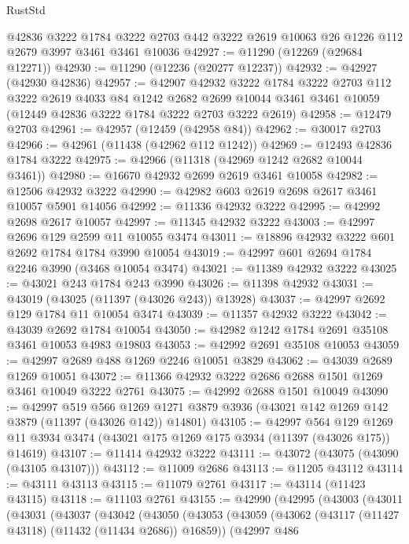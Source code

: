 \begin{lexlean}{RustStd}
\begin{coremodule}
    @42836
    @3222
    @1784
    @3222
    @2703
    @442
    @3222
    @2619
    @10063
    @26
    @1226
    @112
    @2679
    @3997
    @3461
    @3461
    @10036
@42927 := @11290 (@12269 (@29684 @12271))
@42930 := @11290 (@12236 (@20277 @12237))
@42932 := @42927 (@42930 @42836)
@42957 := @42907
    @42932
    @3222
    @1784
    @3222
    @2703
    @112
    @3222
    @2619
    @4033
    @84
    @1242
    @2682
    @2699
    @10044
    @3461
    @3461
    @10059
    (@12449 @42836 @3222 @1784 @3222 @2703 @3222 @2619)
@42958 := @12479 @2703
@42961 := @42957 (@12459 (@42958 @84))
@42962 := @30017 @2703
@42966 := @42961 (@11438 (@42962 @112 @1242))
@42969 := @12493 @42836 @1784 @3222
@42975 := @42966 (@11318 (@42969 @1242 @2682 @10044 @3461))
@42980 := @16670 @42932 @2699 @2619 @3461 @10058
@42982 := @12506 @42932 @3222
@42990 := @42982 @603 @2619 @2698 @2617 @3461 @10057 @5901 @14056
@42992 := @11336 @42932 @3222
@42995 := @42992 @2698 @2617 @10057
@42997 := @11345 @42932 @3222
@43003 := @42997 @2696 @129 @2599 @11 @10055 @3474
@43011 := @18896 @42932 @3222 @601 @2692 @1784 @1784 @3990 @10054
@43019 := @42997 @601 @2694 @1784 @2246 @3990 (@3468 @10054 @3474)
@43021 := @11389 @42932 @3222
@43025 := @43021 @243 @1784 @243 @3990
@43026 := @11398 @42932
@43031 := @43019 (@43025 (@11397 (@43026 @243)) @13928)
@43037 := @42997 @2692 @129 @1784 @11 @10054 @3474
@43039 := @11357 @42932 @3222
@43042 := @43039 @2692 @1784 @10054
@43050 := @42982 @1242 @1784 @2691 @35108 @3461 @10053 @4983 @19803
@43053 := @42992 @2691 @35108 @10053
@43059 := @42997 @2689 @488 @1269 @2246 @10051 @3829
@43062 := @43039 @2689 @1269 @10051
@43072 := @11366 @42932 @3222 @2686 @2688 @1501 @1269 @3461 @10049 @3222 @2761
@43075 := @42992 @2688 @1501 @10049
@43090 := @42997
    @519
    @566
    @1269
    @1271
    @3879
    @3936
    (@43021 @142 @1269 @142 @3879 (@11397 (@43026 @142)) @14801)
@43105 := @42997
    @564
    @129
    @1269
    @11
    @3934
    @3474
    (@43021 @175 @1269 @175 @3934 (@11397 (@43026 @175)) @14619)
@43107 := @11414 @42932 @3222
@43111 := @43072 (@43075 (@43090 (@43105 @43107)))
@43112 := @11009 @2686
@43113 := @11205 @43112
@43114 := @43111 @43113
@43115 := @11079 @2761
@43117 := @43114 (@11423 @43115)
@43118 := @11103 @2761
@43155 := @42990
    (@42995
      (@43003
        (@43011
          (@43031
            (@43037
              (@43042
                (@43050
                  (@43053
                    (@43059
                      (@43062 (@43117 (@11427 @43118) (@11432 (@11434 @2686)) @16859))
                      (@42997
                        @486

\end{coremodule}
\end{lexlean}
